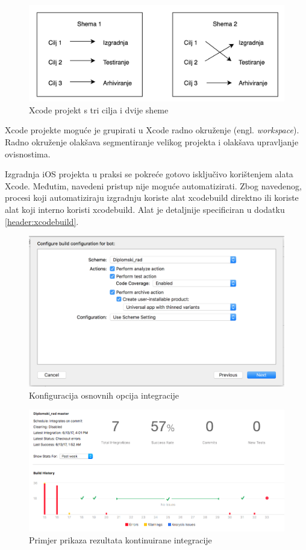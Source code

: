 \documentclass[times, utf8, diplomski, numeric]{fer}
\newcommand{\eng}[1]{(engl. \textit{#1})}
\begin{document}
\begin{figure}[b!]
\centering
\includegraphics[scale=0.5]{TargetScheme}
\caption{Xcode projekt s tri cilja i dvije sheme}
\label{fig:TargetScheme}
\end{figure}

Xcode projekte moguće je grupirati u Xcode radno okruženje \eng{workspace}. Radno okruženje olakšava segmentiranje velikog projekta i olakšava upravljanje ovisnostima.

Izgradnja iOS projekta u praksi se pokreće gotovo isključivo korištenjem alata Xcode. Međutim, navedeni pristup nije moguće automatizirati. Zbog navedenog, procesi koji automatiziraju izgradnju koriste alat xcodebuild direktno ili koriste alat koji interno koristi xcodebuild. Alat je detaljnije specificiran u dodatku \ref{header:xcodebuild}.

\begin{figure}
\centering
\includegraphics[scale=0.5]{XcodeServerOptions}
\caption{Konfiguracija osnovnih opcija integracije}
\label{fig:XcodeServerOptions}
\end{figure}

\begin{figure}[b!]
\centering
\includegraphics[scale=0.5]{XcodeServerResult}
\caption{Primjer prikaza rezultata kontinuirane integracije}
\label{fig:XcodeServerResult}
\end{figure}
\end{document}
